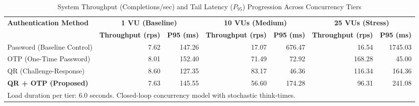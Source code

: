 \begin{table}[t]
\centering
\small
\caption{System Throughput (Completions/sec) and Tail Latency ($P_{95}$) Progression Across Concurrency Tiers}
\label{tab:concurrency_scaling}
\begin{tabular}{lrrrrrr}
\hline
\textbf{Authentication Method} & \multicolumn{2}{c}{\textbf{1 VU (Baseline)}} & \multicolumn{2}{c}{\textbf{10 VUs (Medium)}} & \multicolumn{2}{c}{\textbf{25 VUs (Stress)}} \\
\cline{2-3} \cline{4-5} \cline{6-7}
 & \textbf{Throughput (rps)} & \textbf{P95 (ms)} & \textbf{Throughput (rps)} & \textbf{P95 (ms)} & \textbf{Throughput (rps)} & \textbf{P95 (ms)} \\
\hline
Password (Baseline Control) & 7.62 & 147.26 & 17.07 & 676.47 & 16.54 & 1745.03 \\
OTP (One-Time Password) & 8.01 & 152.40 & 71.49 & 72.92 & 168.28 & 45.00 \\
QR (Challenge-Response) & 8.60 & 127.35 & 83.17 & 46.36 & 116.34 & 164.36 \\
\textbf{QR + OTP (Proposed)} & 7.63 & 145.55 & 56.60 & 174.28 & 96.31 & 241.08 \\
\hline
\multicolumn{7}{l}{\footnotesize Load duration per tier: 6.0 seconds. Closed-loop concurrency model with stochastic think-times.} \\
\end{tabular}
\end{table}
